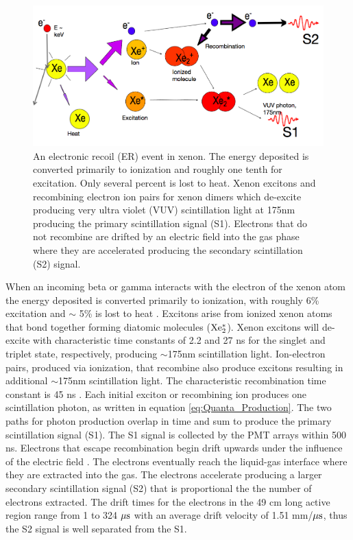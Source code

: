 \renewcommand{\baselinestretch}{1}
\small\normalsize
\begin{figure}[h!]\centering
\includegraphics[width=130mm]{Chapter_LUX_Det/ER_T_Shutt.png}
\caption{An electronic recoil (ER) event in xenon. The energy deposited is converted primarily to ionization and roughly one tenth for excitation. Only several percent is lost to heat. Xenon excitons and recombining electron ion pairs for xenon dimers which de-excite producing very ultra violet  (VUV) scintillation light at 175nm producing the primary scintillation signal (S1). Electrons that do not recombine are drifted by an electric field into the gas phase where they are accelerated producing the secondary scintillation (S2) signal. }
\label{fig:TomS_ER}
\end{figure}
\renewcommand{\baselinestretch}{2}
\small\normalsize


\noindent When an incoming beta or gamma interacts with the electron of the xenon atom the energy deposited is converted primarily to ionization,  with roughly 6\% excitation and $\sim$ 5\% is lost to heat \cite{alpha_xenon} \cite{FanoTheoretical}. Excitons arise from ionized xenon atoms that bond together forming diatomic molecules ($\rm Xe^*_2$). Xenon excitons will de-excite with characteristic time constants of 2.2 and 27 ns for the singlet and triplet state, respectively, producing $\sim$175nm scintillation light. Ion-electron pairs, produced via ionization, that recombine also produce excitons resulting in additional $\sim$175nm scintillation light. The characteristic recombination time constant is 45 ns \cite{Xe_Recombination_Time}. Each initial exciton or recombining ion produces one scintillation photon, as written in equation \ref{eq:Quanta_Production}. The two paths for photon production overlap in time and sum to produce the primary scintillation signal (S1). The S1 signal is collected by the PMT arrays within 500 ns. Electrons that escape recombination begin drift upwards under the influence of the electric field . The electrons eventually reach the liquid-gas interface where they are extracted into the gas. The electrons accelerate producing a larger secondary scintillation signal (S2) that is proportional the the number of electrons extracted. The drift times for the electrons in the 49 cm long active region range from 1 to 324 $\rm \mu s$ with an average drift velocity of 1.51 mm/$\rm \mu s$, thus the S2 signal is well separated from the S1. 


